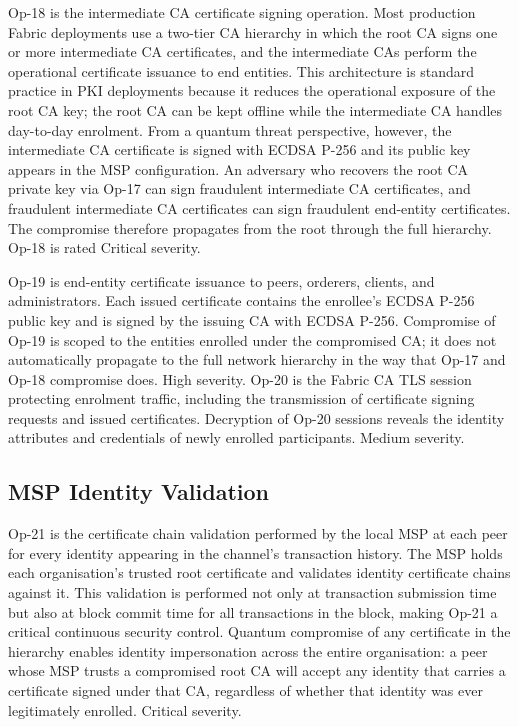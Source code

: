 \documentclass[conference]{IEEEtran}
\begin{document}
Op-18 is the intermediate CA certificate signing operation. Most
production Fabric deployments use a two-tier CA hierarchy in which the
root CA signs one or more intermediate CA certificates, and the intermediate
CAs perform the operational certificate issuance to end entities. This
architecture is standard practice in PKI deployments because it reduces
the operational exposure of the root CA key; the root CA can be kept
offline while the intermediate CA handles day-to-day enrolment. From a
quantum threat perspective, however, the intermediate CA certificate
is signed with ECDSA P-256 and its public key appears in the MSP
configuration. An adversary who recovers the root CA private key via
Op-17 can sign fraudulent intermediate CA certificates, and fraudulent
intermediate CA certificates can sign fraudulent end-entity certificates.
The compromise therefore propagates from the root through the full
hierarchy. Op-18 is rated Critical severity.

Op-19 is end-entity certificate issuance to peers, orderers, clients, and
administrators. Each issued certificate contains the enrollee's ECDSA P-256
public key and is signed by the issuing CA with ECDSA P-256. Compromise
of Op-19 is scoped to the entities enrolled under the compromised CA;
it does not automatically propagate to the full network hierarchy in the
way that Op-17 and Op-18 compromise does. High severity. Op-20 is the
Fabric CA TLS session protecting enrolment traffic, including the
transmission of certificate signing requests and issued certificates.
Decryption of Op-20 sessions reveals the identity attributes and
credentials of newly enrolled participants. Medium severity.

\subsection{MSP Identity Validation}

Op-21 is the certificate chain validation performed by the local MSP at
each peer for every identity appearing in the channel's transaction
history. The MSP holds each organisation's trusted root certificate and
validates identity certificate chains against it. This validation is
performed not only at transaction submission time but also at block commit
time for all transactions in the block, making Op-21 a critical continuous
security control. Quantum compromise of any certificate in the hierarchy
enables identity impersonation across the entire organisation: a peer
whose MSP trusts a compromised root CA will accept any identity that
carries a certificate signed under that CA, regardless of whether that
identity was ever legitimately enrolled. Critical severity.
\end{document}
